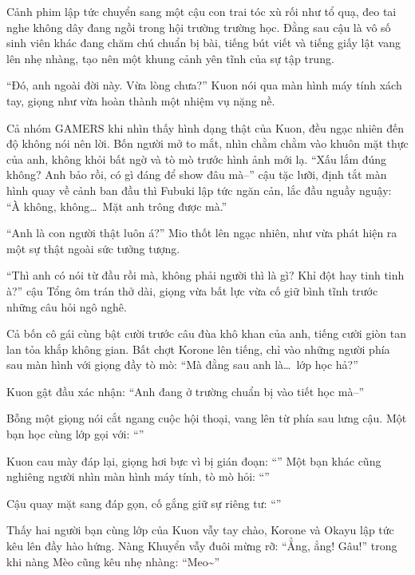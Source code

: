 \documentclass[../main.tex]{subfiles}
\begin{document}
Cảnh phim lập tức chuyển sang một cậu con trai tóc xù rối như tổ quạ, đeo tai nghe không dây đang ngồi trong hội trường trường học. Đằng sau cậu là vô số sinh viên khác đang chăm chú chuẩn bị bài, tiếng bút viết và tiếng giấy lật vang lên nhẹ nhàng, tạo nên một khung cảnh yên tĩnh của sự tập trung.


``Đó, anh ngoài đời này. Vừa lòng chưa?'' Kuon nói qua màn hình máy tính xách tay, giọng như vừa hoàn thành một nhiệm vụ nặng nề.

Cả nhóm GAMERS khi nhìn thấy hình dạng thật của Kuon, đều ngạc nhiên đến độ không nói nên lời. Bốn người mở to mắt, nhìn chằm chằm vào khuôn mặt thực của anh, không khỏi bất ngờ và tò mò trước hình ảnh mới lạ. ``Xấu lắm đúng không? Anh bảo rồi, có gì đáng để show đâu mà--'' cậu tặc lưỡi, định tắt màn hình quay về cảnh ban đầu thì Fubuki lập tức ngăn cản, lắc đầu nguầy nguậy: ``À không, không\dots\ Mặt anh trông được mà.''

``Anh là con người thật luôn á?'' Mio thốt lên ngạc nhiên, như vừa phát hiện ra một sự thật ngoài sức tưởng tượng.

``Thì anh có nói từ đầu rồi mà, không phải người thì là gì? Khỉ đột hay tinh tinh à?'' cậu Tổng ôm trán thở dài, giọng vừa bất lực vừa cố giữ bình tĩnh trước những câu hỏi ngô nghê.

Cả bốn cô gái cùng bật cười trước câu đùa khô khan của anh, tiếng cười giòn tan lan tỏa khắp không gian. Bất chợt Korone lên tiếng, chỉ vào những người phía sau màn hình với giọng đầy tò mò: ``Mà đằng sau anh là\dots\ lớp học hả?''

Kuon gật đầu xác nhận: ``Anh đang ở trường chuẩn bị vào tiết học mà--''

Bỗng một giọng nói cắt ngang cuộc hội thoại, vang lên từ phía sau lưng cậu. Một bạn học cùng lớp gọi với: ``''

Kuon cau mày đáp lại, giọng hơi bực vì bị gián đoạn: ``'' Một bạn khác cũng nghiêng người nhìn màn hình máy tính, tò mò hỏi: ``''

Cậu quay mặt sang đáp gọn, cố gắng giữ sự riêng tư: ``''

Thấy hai người bạn cùng lớp của Kuon vẫy tay chào, Korone và Okayu lập tức kêu lên đầy hào hứng. Nàng Khuyển vẫy đuôi mừng rỡ: ``Ẳng, ẳng! Gâu!'' trong khi nàng Mèo cũng kêu nhẹ nhàng: ``Meo\~{}''
\end{document}
